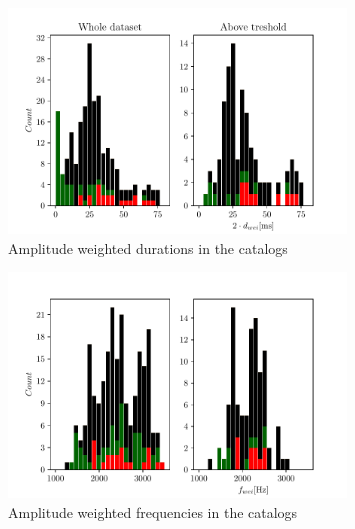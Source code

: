 \begin{figure}[hbt!]
\begin{center}
\includegraphics[width=0.8\textwidth, angle=0]{images/Data_analysis/results/alpha_dhist.pdf}
\caption{Amplitude weighted durations in the catalogs}
\label{adhist}
\end{center}
\end{figure}

\begin{figure}[hbt!]
\begin{center}
\includegraphics[width=0.8\textwidth, angle=0]{images/Data_analysis/results/alpha_fhist.pdf}
\caption{Amplitude weighted frequencies in the catalogs}
\label{afhist}
\end{center}
\end{figure}
\FloatBarrier


